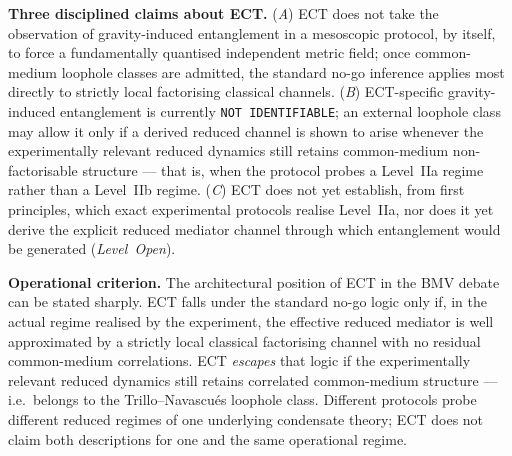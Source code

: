 \documentclass[11pt,a4paper]{article}
\begin{document}
\textbf{Three disciplined claims about ECT.}
(\emph{A}) ECT does not take the observation of gravity-induced
entanglement in a mesoscopic protocol, by itself, to force a
fundamentally quantised independent metric field; once common-medium
loophole classes are admitted, the standard no-go inference applies
most directly to strictly local factorising classical channels.
(\emph{B}) ECT-specific gravity-induced entanglement is currently \texttt{NOT IDENTIFIABLE}; an external loophole class may allow it only if a derived reduced channel is shown to
arise whenever the experimentally relevant reduced dynamics still
retains common-medium non-factorisable structure --- that is, when
the protocol probes a Level~IIa regime rather than a Level~IIb
regime. (\emph{C}) ECT does not yet establish, from first principles,
which exact experimental protocols realise Level~IIa, nor does it
yet derive the explicit reduced mediator channel through which
entanglement would be generated (\emph{Level~Open}).

\textbf{Operational criterion.}
The architectural position of ECT in the BMV debate can be stated
sharply. ECT falls under the standard no-go logic only if, in the
actual regime realised by the experiment, the effective reduced
mediator is well approximated by a strictly local classical
factorising channel with no residual common-medium correlations.
ECT \emph{escapes} that logic if the experimentally relevant reduced
dynamics still retains correlated common-medium structure --- i.e.\
belongs to the Trillo--Navascu\'es loophole class. Different
protocols probe different reduced regimes of one underlying
condensate theory; ECT does not claim both descriptions for one and
the same operational regime.
\end{document}
